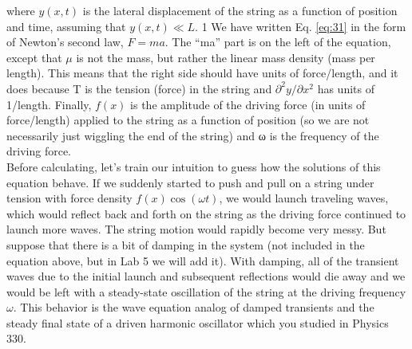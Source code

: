 		where $y(x,t)$ is the lateral displacement of the string as a function of position
and time, assuming that $y(x,t) ≪ L.$
1 We have written Eq. \ref{eq:31} in the form of
Newton\rq s second law, $F = ma$. The “ma” part is on the left of the equation, except
that $\mu$ is not the mass, but rather the linear mass density (mass per length). This
means that the right side should have units of force/length, and it does because
T is the tension (force) in the string and $\partial^2y / \partial x^2$
 has units of 1/length. Finally,
$f (x)$ is the amplitude of the driving force (in units of force/length) applied to the
string as a function of position (so we are not necessarily just wiggling the end of
the string) and ω is the frequency of the driving force. \\
Before calculating, let\rq s train our intuition to guess how the solutions of this
equation behave. If we suddenly started to push and pull on a string under tension
with force density $f(x)\cos(\omega t)$, we would launch traveling waves, which would
reflect back and forth on the string as the driving force continued to launch more
waves. The string motion would rapidly become very messy. But suppose that
there is a bit of damping in the system (not included in the equation above, but in
Lab 5 we will add it). With damping, all of the transient waves due to the initial
launch and subsequent reflections would die away and we would be left with a
steady-state oscillation of the string at the driving frequency $\omega$. This behavior is
the wave equation analog of damped transients and the steady final state of a
driven harmonic oscillator which you studied in Physics 330.		

